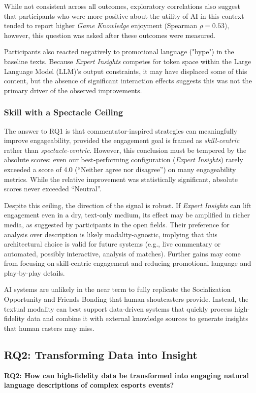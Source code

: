 While not consistent across all outcomes, exploratory correlations also suggest that participants who were more positive about the utility of AI in this context tended to report higher \textit{Game Knowledge} enjoyment (Spearman $\rho=0.53$), however, this question was asked after these outcomes were measured.

Participants also reacted negatively to promotional language ("hype") in the baseline texts. Because \textit{Expert Insights} competes for token space within the Large Language Model (LLM)'s output constraints, it may have displaced some of this content, but the absence of significant interaction effects suggests this was not the primary driver of the observed improvements.

\subsubsection{Skill with a Spectacle Ceiling}
The answer to RQ1 is that commentator-inspired strategies can meaningfully improve engageability, provided the engagement goal is framed as \textit{skill-centric} rather than \textit{spectacle-centric}. However, this conclusion must be tempered by the absolute scores: even our best-performing configuration (\textit{Expert Insights}) rarely exceeded a score of 4.0 (``Neither agree nor disagree'') on many engageability metrics. While the relative improvement was statistically significant, absolute scores never exceeded ``Neutral''.

Despite this ceiling, the direction of the signal is robust. If \textit{Expert Insights} can lift engagement even in a dry, text-only medium, its effect may be amplified in richer media, as suggested by participants in the open fields. Their preference for analysis over description is likely modality-agnostic, implying that this architectural choice is valid for future systems (e.g., live commentary or automated, possibly interactive, analysis of matches). Further gains may come from focusing on skill-centric engagement and reducing promotional language and play-by-play details.

AI systems are unlikely in the near term to fully replicate the Socialization Opportunity and Friends Bonding that human shoutcasters provide. Instead, the textual modality can best support data-driven systems that quickly process high-fidelity data and combine it with external knowledge sources to generate insights that human casters may miss.

\subsection{RQ2: Transforming Data into Insight}
\textbf{RQ2: How can high-fidelity data be transformed into engaging natural language descriptions of complex esports events?}

